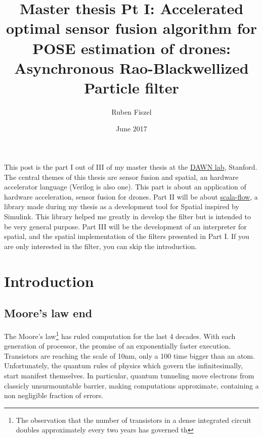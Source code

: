 \documentclass[]{article}
\title{Master thesis Pt I: Accelerated optimal sensor fusion algorithm for POSE
estimation of drones: Asynchronous Rao-Blackwellized Particle filter}
\author{Ruben Fiszel}
\date{June 2017}
\begin{document}
\maketitle

This post is the part I out of III of my master thesis at the
\href{http://dawn.cs.stanford.edu/}{DAWN lab}, Stanford. The central
themes of this thesis are sensor fusion and spatial, an hardware
accelerator language (Verilog is also one). This part is about an
application of hardware acceleration, sensor fusion for drones. Part II
will be about
\href{https://github.com/rubenfiszel/scala-flow/}{scala-flow}, a library
made during my thesis as a development tool for Spatial inspired by
Simulink. This library helped me greatly in develop the filter but is
intended to be very general purpose. Part III will be the development of
an interpreter for spatial, and the spatial implementation of the
filters presented in Part I. If you are only interested in the filter,
you can skip the introduction.

\section{Introduction}\label{introduction}

\subsection{Moore's law end}\label{moores-law-end}

The Moore's law\footnote{The observation that the number of transistors
  in a dense integrated circuit doubles approximately every two years
  has governed th} has ruled computation for the last 4 decades. With
each generation of processor, the promise of an exponentially faster
execution. Transistors are reaching the scale of 10nm, only a 100 time
bigger than an atom. Unfortunately, the quantum rules of physics which
govern the infinitesimally, start manifest themselves. In particular,
quantum tunneling move electrons from classicly unsurmountable barrier,
making computations approximate, containing a non negligible fraction of
errors.
\end{document}
